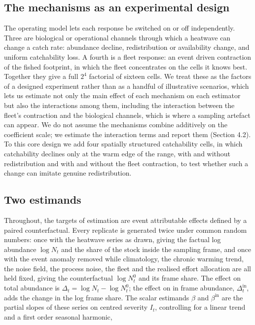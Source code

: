 \documentclass[
  11pt,
  a4paper,
]{article}
\begin{document}
\hypertarget{the-mechanisms-as-an-experimental-design}{%
\subsection{The mechanisms as an experimental
design}\label{the-mechanisms-as-an-experimental-design}}

The operating model lets each response be switched on or off
independently. Three are biological or operational channels through
which a heatwave can change a catch rate: abundance decline,
redistribution or availability change, and uniform catchability loss. A
fourth is a fleet response: an event driven contraction of the fished
footprint, in which the fleet concentrates on the cells it knows best.
Together they give a full \(2^{4}\) factorial of sixteen cells. We treat
these as the factors of a designed experiment rather than as a handful
of illustrative scenarios, which lets us estimate not only the main
effect of each mechanism on each estimator but also the interactions
among them, including the interaction between the fleet's contraction
and the biological channels, which is where a sampling artefact can
appear. We do not assume the mechanisms combine additively on the
coefficient scale; we estimate the interaction terms and report them
(Section 4.2). To this core design we add four spatially structured
catchability cells, in which catchability declines only at the warm edge
of the range, with and without redistribution and with and without the
fleet contraction, to test whether such a change can imitate genuine
redistribution.

\hypertarget{two-estimands}{%
\subsection{Two estimands}\label{two-estimands}}

Throughout, the targets of estimation are event attributable effects
defined by a paired counterfactual. Every replicate is generated twice
under common random numbers: once with the heatwave series as drawn,
giving the factual log abundance \(\log N_t\) and the share of the stock
inside the sampling frame, and once with the event anomaly removed while
climatology, the chronic warming trend, the noise field, the process
noise, the fleet and the realised effort allocation are all held fixed,
giving the counterfactual \(\log N^{0}_t\) and its frame share. The
effect on total abundance is \(\Delta_t = \log N_t - \log N^{0}_t\); the
effect on in frame abundance, \(\Delta^{\text{in}}_t\), adds the change
in the log frame share. The scalar estimands \(\beta\) and
\(\beta^{\text{in}}\) are the partial slopes of these series on centred
severity \(I_t\), controlling for a linear trend and a first order
seasonal harmonic,
\end{document}
